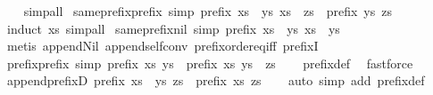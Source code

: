 \begin{isabellebody}
%
\isadelimproof
\ \ %
\endisadelimproof
%
\isatagproof
{}\isamarkupfalse%
\ simp{\isacharunderscore}all%
\endisatagproof
{\isafoldproof}%
%
\isadelimproof
\isanewline
%
\endisadelimproof
\isanewline
{}\isamarkupfalse%
\ same{\isacharunderscore}prefix{\isacharunderscore}prefix\ {\isacharbrackleft}simp{\isacharbrackright}{\isacharcolon}\ {\isachardoublequoteopen}prefix\ {\isacharparenleft}xs\ {\isacharat}\ ys{\isacharparenright}\ {\isacharparenleft}xs\ {\isacharat}\ zs{\isacharparenright}\ {\isacharequal}\ prefix\ ys\ zs{\isachardoublequoteclose}\isanewline
%
\isadelimproof
\ \ %
\endisadelimproof
%
\isatagproof
{}\isamarkupfalse%
\ {\isacharparenleft}induct\ xs{\isacharparenright}\ simp{\isacharunderscore}all%
\endisatagproof
{\isafoldproof}%
%
\isadelimproof
\isanewline
%
\endisadelimproof
\isanewline
{}\isamarkupfalse%
\ same{\isacharunderscore}prefix{\isacharunderscore}nil\ {\isacharbrackleft}simp{\isacharbrackright}{\isacharcolon}\ {\isachardoublequoteopen}prefix\ {\isacharparenleft}xs\ {\isacharat}\ ys{\isacharparenright}\ xs\ {\isacharequal}\ {\isacharparenleft}ys\ {\isacharequal}\ {\isacharbrackleft}{\isacharbrackright}{\isacharparenright}{\isachardoublequoteclose}\isanewline
%
\isadelimproof
\ \ %
\endisadelimproof
%
\isatagproof
{}\isamarkupfalse%
\ {\isacharparenleft}metis\ append{\isacharunderscore}Nil{}\ append{\isacharunderscore}self{\isacharunderscore}conv\ prefix{\isacharunderscore}order{\isachardot}eq{\isacharunderscore}iff\ prefixI{\isacharparenright}%
\endisatagproof
{\isafoldproof}%
%
\isadelimproof
\isanewline
%
\endisadelimproof
\isanewline
{}\isamarkupfalse%
\ prefix{\isacharunderscore}prefix\ {\isacharbrackleft}simp{\isacharbrackright}{\isacharcolon}\ {\isachardoublequoteopen}prefix\ xs\ ys\ {\isasymLongrightarrow}\ prefix\ xs\ {\isacharparenleft}ys\ {\isacharat}\ zs{\isacharparenright}{\isachardoublequoteclose}\isanewline
%
\isadelimproof
\ \ %
\endisadelimproof
%
\isatagproof
{}\isamarkupfalse%
\ prefix{\isacharunderscore}def\ \isamarkupfalse%
\ fastforce%
\endisatagproof
{\isafoldproof}%
%
\isadelimproof
\isanewline
%
\endisadelimproof
\isanewline
{}\isamarkupfalse%
\ append{\isacharunderscore}prefixD{\isacharcolon}\ {\isachardoublequoteopen}prefix\ {\isacharparenleft}xs\ {\isacharat}\ ys{\isacharparenright}\ zs\ {\isasymLongrightarrow}\ prefix\ xs\ zs{\isachardoublequoteclose}\isanewline
%
\isadelimproof
\ \ %
\endisadelimproof
%
\isatagproof
{}\isamarkupfalse%
\ {\isacharparenleft}auto\ simp\ add{\isacharcolon}\ prefix{\isacharunderscore}def{\isacharparenright}%

\end{isabellebody}
